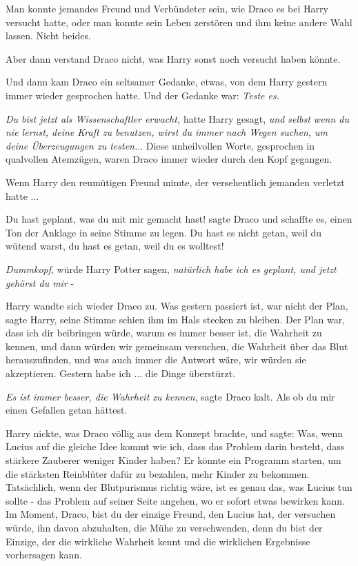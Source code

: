 Man konnte jemandes Freund und Verbündeter sein, wie Draco es bei Harry versucht
hatte, oder man konnte sein Leben zerstören und ihm keine andere Wahl lassen.
Nicht beides.

Aber dann verstand Draco nicht, was Harry sonst noch versucht haben könnte.

Und dann kam Draco ein seltsamer Gedanke, etwas, von dem Harry gestern immer
wieder gesprochen hatte. Und der Gedanke war: \emph{Teste es.}

\emph{Du bist jetzt als Wissenschaftler erwacht,} hatte Harry gesagt, \emph{und
selbst wenn du nie lernst, deine Kraft zu benutzen, wirst du immer nach Wegen
suchen, um deine Überzeugungen zu testen.}.. Diese unheilvollen Worte,
gesprochen in qualvollen Atemzügen, waren Draco immer wieder durch den Kopf
gegangen.

Wenn Harry den reumütigen Freund mimte, der versehentlich jemanden verletzt
hatte ...

\glqq{}Du hast geplant, was du mit mir gemacht hast!\grqq{} sagte Draco und
schaffte es, einen Ton der Anklage in seine Stimme zu legen. \glqq{}Du hast es
nicht getan, weil du wütend warst, du hast es getan, weil du es wolltest!\grqq{}

\emph{Dummkopf}, würde Harry Potter sagen, \emph{natürlich habe ich es geplant,
und jetzt gehörst du mir} -

Harry wandte sich wieder Draco zu. \glqq{}Was gestern passiert ist, war nicht
der Plan\grqq{}, sagte Harry, seine Stimme schien ihm im Hals stecken zu
bleiben. \glqq{}Der Plan war, dass ich dir beibringen würde, warum es immer
besser ist, die Wahrheit zu kennen, und dann würden wir gemeinsam versuchen, die
Wahrheit über das Blut herauszufinden, und was auch immer die Antwort wäre, wir
würden sie akzeptieren. Gestern habe ich ... die Dinge überstürzt.\grqq{}

\glqq{}\emph{Es ist immer besser, die Wahrheit zu kennen}\grqq{}, sagte Draco
kalt. \glqq{}Als ob du mir einen Gefallen getan hättest.\grqq{}

Harry nickte, was Draco völlig aus dem Konzept brachte, und sagte: \glqq{}Was,
wenn Lucius auf die gleiche Idee kommt wie ich, dass das Problem darin besteht,
dass stärkere Zauberer weniger Kinder haben? Er könnte ein Programm starten, um
die stärksten Reinblüter dafür zu bezahlen, mehr Kinder zu bekommen.
Tatsächlich, wenn der Blutpurismus richtig wäre, ist es genau das, was Lucius
tun sollte - das Problem auf seiner Seite angehen, wo er sofort etwas bewirken
kann. Im Moment, Draco, bist du der einzige Freund, den Lucius hat, der
versuchen würde, ihn davon abzuhalten, die Mühe zu verschwenden, denn du bist
der Einzige, der die wirkliche Wahrheit kennt und die wirklichen Ergebnisse
vorhersagen kann.\grqq{}

